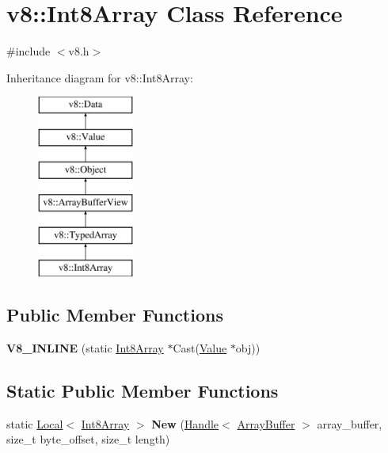 \hypertarget{classv8_1_1_int8_array}{}\section{v8\+:\+:Int8\+Array Class Reference}
\label{classv8_1_1_int8_array}


{\ttfamily \#include $<$v8.\+h$>$}

Inheritance diagram for v8\+:\+:Int8\+Array\+:\begin{figure}[H]
\begin{center}
\leavevmode
\includegraphics[height=6.000000cm]{classv8_1_1_int8_array}
\end{center}
\end{figure}
\subsection*{Public Member Functions}
\begin{DoxyCompactItemize}
\item 
\hypertarget{classv8_1_1_int8_array_a2f12a8e33c37a5ac6c4b1141b868d4c4}{}{\bfseries V8\+\_\+\+I\+N\+L\+I\+N\+E} (static \hyperlink{classv8_1_1_int8_array}{Int8\+Array} $\ast$Cast(\hyperlink{classv8_1_1_value}{Value} $\ast$obj))\label{classv8_1_1_int8_array_a2f12a8e33c37a5ac6c4b1141b868d4c4}

\end{DoxyCompactItemize}
\subsection*{Static Public Member Functions}
\begin{DoxyCompactItemize}
\item 
\hypertarget{classv8_1_1_int8_array_a40454c011895180c803650ba7294139b}{}static \hyperlink{classv8_1_1_local}{Local}$<$ \hyperlink{classv8_1_1_int8_array}{Int8\+Array} $>$ {\bfseries New} (\hyperlink{classv8_1_1_handle}{Handle}$<$ \hyperlink{classv8_1_1_array_buffer}{Array\+Buffer} $>$ array\+\_\+buffer, size\+\_\+t byte\+\_\+offset, size\+\_\+t length)\label{classv8_1_1_int8_array_a40454c011895180c803650ba7294139b}

\end{DoxyCompactItemize}


